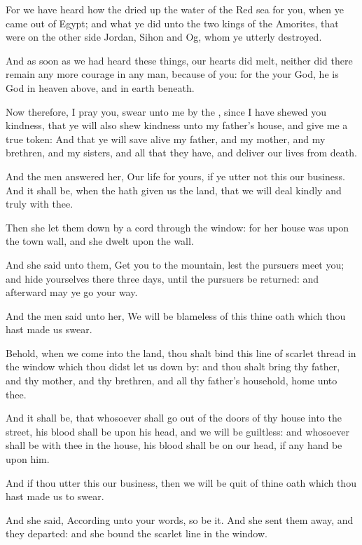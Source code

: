 \Verse For we have heard how the \LORD dried up the water of the Red sea for you, when ye came out of Egypt; and what ye did unto the two kings of the Amorites, that were on the other side Jordan, Sihon and Og, whom ye utterly destroyed.

\Verse And as soon as we had heard these things, our hearts did melt, neither did there remain any more courage in any man, because of you: for the \LORD your God, he is God in heaven above, and in earth beneath.

\Verse Now therefore, I pray you, swear unto me by the \LORD, since I have shewed you kindness, that ye will also shew kindness unto my father's house, and give me a true token: \Verse And that ye will save alive my father, and my mother, and my brethren, and my sisters, and all that they have, and deliver our lives from death.

\Verse And the men answered her, Our life for yours, if ye utter not this our business. And it shall be, when the \LORD hath given us the land, that we will deal kindly and truly with thee.

\Verse Then she let them down by a cord through the window: for her house was upon the town wall, and she dwelt upon the wall.

\Verse And she said unto them, Get you to the mountain, lest the pursuers meet you; and hide yourselves there three days, until the pursuers be returned: and afterward may ye go your way.

\Verse And the men said unto her, We will be blameless of this thine oath which thou hast made us swear.

\Verse Behold, when we come into the land, thou shalt bind this line of scarlet thread in the window which thou didst let us down by: and thou shalt bring thy father, and thy mother, and thy brethren, and all thy father's household, home unto thee.

\Verse And it shall be, that whosoever shall go out of the doors of thy house into the street, his blood shall be upon his head, and we will be guiltless: and whosoever shall be with thee in the house, his blood shall be on our head, if any hand be upon him.

\Verse And if thou utter this our business, then we will be quit of thine oath which thou hast made us to swear.

\Verse And she said, According unto your words, so be it. And she sent them away, and they departed: and she bound the scarlet line in the window.


